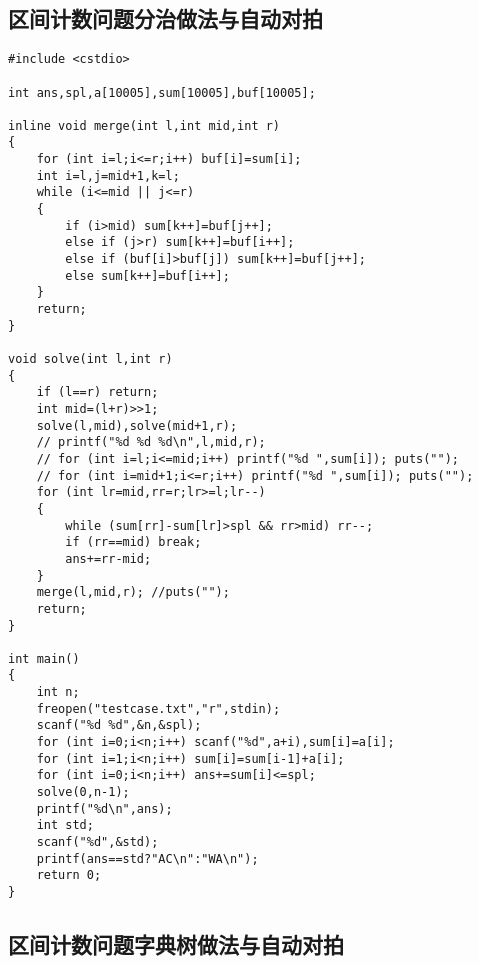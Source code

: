 \documentclass{article}
\begin{document}
\subsection{区间计数问题分治做法与自动对拍}

\begin{lstlisting}
#include <cstdio>

int ans,spl,a[10005],sum[10005],buf[10005];

inline void merge(int l,int mid,int r)
{
    for (int i=l;i<=r;i++) buf[i]=sum[i];
    int i=l,j=mid+1,k=l;
    while (i<=mid || j<=r)
    {
        if (i>mid) sum[k++]=buf[j++];
        else if (j>r) sum[k++]=buf[i++];
        else if (buf[i]>buf[j]) sum[k++]=buf[j++];
        else sum[k++]=buf[i++];
    }
    return;
}

void solve(int l,int r)
{
    if (l==r) return;
    int mid=(l+r)>>1;
    solve(l,mid),solve(mid+1,r);
    // printf("%d %d %d\n",l,mid,r);
    // for (int i=l;i<=mid;i++) printf("%d ",sum[i]); puts("");
    // for (int i=mid+1;i<=r;i++) printf("%d ",sum[i]); puts("");
    for (int lr=mid,rr=r;lr>=l;lr--)
    {
        while (sum[rr]-sum[lr]>spl && rr>mid) rr--;
        if (rr==mid) break;
        ans+=rr-mid;
    }
    merge(l,mid,r); //puts("");
    return;
}

int main()
{
    int n;
    freopen("testcase.txt","r",stdin);
    scanf("%d %d",&n,&spl);
    for (int i=0;i<n;i++) scanf("%d",a+i),sum[i]=a[i];
    for (int i=1;i<n;i++) sum[i]=sum[i-1]+a[i];
    for (int i=0;i<n;i++) ans+=sum[i]<=spl;
    solve(0,n-1);
    printf("%d\n",ans);
    int std;
    scanf("%d",&std);
    printf(ans==std?"AC\n":"WA\n");
    return 0;
}
\end{lstlisting}

\subsection{区间计数问题字典树做法与自动对拍}
\end{document}
